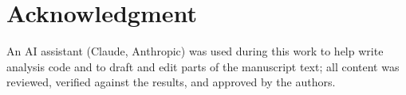 \section*{Acknowledgment}

An AI assistant (Claude, Anthropic) was used during this work to help write analysis
code and to draft and edit parts of the manuscript text; all content was reviewed,
verified against the results, and approved by the authors.
